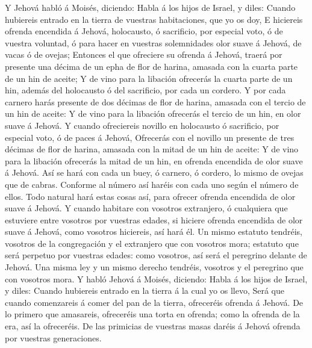 Y Jehová habló á Moisés, diciendo:  Habla á
los hijos de Israel, y diles: Cuando hubiereis entrado en la tierra de
vuestras habitaciones, que yo os doy,  E hiciereis ofrenda
encendida á Jehová, holocausto, ó sacrificio, por especial voto, ó de
vuestra voluntad, ó para hacer en vuestras solemnidades olor suave á
Jehová, de vacas ó de ovejas;  Entonces el que ofreciere
su ofrenda á Jehová, traerá por presente una décima de un epha de flor
de harina, amasada con la cuarta parte de un hin de aceite;
 Y de vino para la libación ofrecerás la cuarta parte de
un hin, además del holocausto ó del sacrificio, por cada un cordero.
 Y por cada carnero harás presente de dos décimas de flor
de harina, amasada con el tercio de un hin de aceite:  Y
de vino para la libación ofrecerás el tercio de un hin, en olor suave á
Jehová.  Y cuando ofreciereis novillo en holocausto ó
sacrificio, por especial voto, ó de paces á Jehová, 
Ofrecerás con el novillo un presente de tres décimas de flor de harina,
amasada con la mitad de un hin de aceite:  Y de vino para
la libación ofrecerás la mitad de un hin, en ofrenda encendida de olor
suave á Jehová.  Así se hará con cada un buey, ó carnero,
ó cordero, lo mismo de ovejas que de cabras.  Conforme al
número así haréis con cada uno según el número de ellos. 
Todo natural hará estas cosas así, para ofrecer ofrenda encendida de
olor suave á Jehová.  Y cuando habitare con vosotros
extranjero, ó cualquiera que estuviere entre vosotros por vuestras
edades, si hiciere ofrenda encendida de olor suave á Jehová, como
vosotros hiciereis, así hará él.  Un mismo estatuto
tendréis, vosotros de la congregación y el extranjero que con vosotros
mora; estatuto que será perpetuo por vuestras edades: como vosotros, así
será el peregrino delante de Jehová.  Una misma ley y un
mismo derecho tendréis, vosotros y el peregrino que con vosotros mora.
 Y habló Jehová á Moisés, diciendo:  Habla
á los hijos de Israel, y diles: Cuando hubiereis entrado en la tierra á
la cual yo os llevo,  Será que cuando comenzareis á comer
del pan de la tierra, ofreceréis ofrenda á Jehová.  De lo
primero que amasareis, ofreceréis una torta en ofrenda; como la ofrenda
de la era, así la ofreceréis.  De las primicias de
vuestras masas daréis á Jehová ofrenda por vuestras generaciones.
